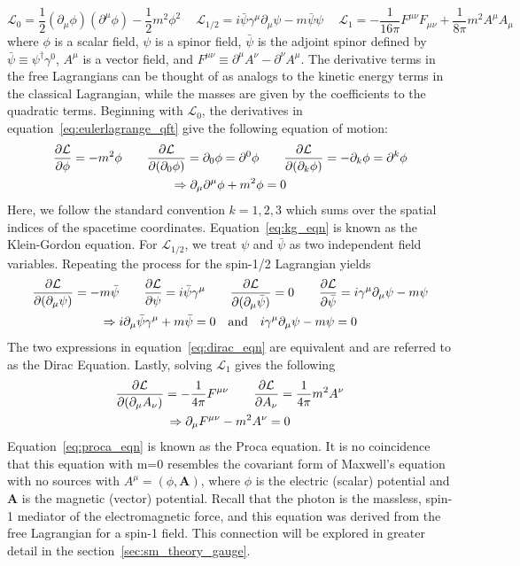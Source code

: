 \begin{equation}\label{eq:lagrangians}
	\mathcal{L}_0=\frac{1}{2}\left(\partial_\mu\phi\right)\left(\partial^\mu\phi\right)-\frac{1}{2}m^2\phi^2\quad \ 
	\mathcal{L}_{1/2}=i\bar{\psi}\gamma^\mu\partial_\mu\psi-m\bar{\psi}\psi \quad \ 
	\mathcal{L}_{1}=-\frac{1}{16\pi}F^{\mu\nu}F_{\mu\nu}+\frac{1}{8\pi}m^2A^\mu A_\mu
\end{equation}
where $\phi$ is a scalar field, $\psi$ is a spinor field, $\bar{\psi}$ is the adjoint spinor defined by $\bar{\psi}\equiv\psi^\dagger\gamma^0$, $A^\mu$ is a vector field, and $F^{\mu\nu}\equiv\partial^\mu A^\nu-\partial^\nu A^\mu$. The derivative terms in the free Lagrangians can be thought of as analogs to the kinetic energy terms in the classical Lagrangian, while the masses are given by the coefficients to the quadratic terms. Beginning with $\mathcal{L}_0$, the derivatives in equation~\ref{eq:eulerlagrange_qft} give the following equation of motion:
\begin{gather}
	\pdv{\mathcal{L}}{\phi}=-m^2\phi \qquad
	\pdv{\mathcal{L}}{(\partial_0\phi)}=\partial_0\phi=\partial^0\phi \qquad
	\pdv{\mathcal{L}}{(\partial_k\phi)}=-\partial_k\phi=\partial^k\phi	\\
	\Rightarrow \partial_\mu\partial^\mu\phi+m^2\phi=0 \label{eq:kg_eqn}
\end{gather}
Here, we follow the standard convention $k=1,2,3$ which sums over the spatial indices of the spacetime coordinates. Equation~\ref{eq:kg_eqn} is known as the Klein-Gordon equation. For $\mathcal{L}_{1/2}$, we treat $\psi$ and $\bar{\psi}$ as two independent field variables. Repeating the process for the spin-1/2 Lagrangian yields
\begin{gather}
	\pdv{\mathcal{L}}{(\partial_\mu\psi)}=-m\bar{\psi} \qquad \pdv{\mathcal{L}}{\psi}=i\bar{\psi}\gamma^\mu \qquad
	\pdv{\mathcal{L}}{(\partial_\mu\bar{\psi})}=0 \qquad
	\pdv{\mathcal{L}}{\bar{\psi}}=i\gamma^\mu\partial_\mu\psi-m\psi	\\
	\Rightarrow i\partial_\mu\bar{\psi}\gamma^\mu+m\bar{\psi}=0 \quad \text{and} \quad i\gamma^\mu\partial_\mu\psi-m\psi=0 \label{eq:dirac_eqn}
\end{gather}
The two expressions in equation~\ref{eq:dirac_eqn} are equivalent and are referred to as the Dirac Equation. Lastly, solving $\mathcal{L}_1$ gives the following
\begin{gather}
	\pdv{\mathcal{L}}{(\partial_\mu A_\nu)}=-\frac{1}{4\pi}F^{\mu\nu} \qquad \pdv{\mathcal{L}}{A_\nu}=\frac{1}{4\pi}m^2A^\nu \\
	\Rightarrow \partial_\mu F^{\mu\nu}-m^2A^\nu=0 \label{eq:proca_eqn}
\end{gather}
Equation~\ref{eq:proca_eqn} is known as the Proca equation. It is no coincidence that this equation with m=0 resembles the covariant form of Maxwell's equation with no sources with $A^\mu=(\phi, \mathbf{A})$, where $\phi$ is the electric (scalar) potential and $\mathbf{A}$ is the magnetic (vector) potential. Recall that the photon is the massless, spin-1 mediator of the electromagnetic force, and this equation was derived from the free Lagrangian for a spin-1 field. This connection will be explored in greater detail in the section~\ref{sec:sm_theory_gauge}.


